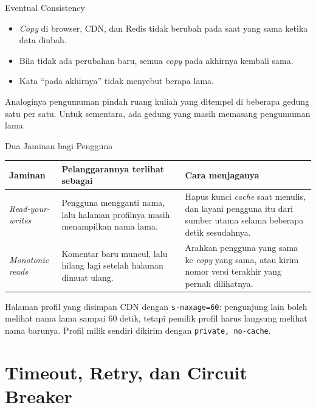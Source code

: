 \documentclass[aspectratio=169, table, 12pt]{beamer}
\begin{document}
\begin{frame}{{\Large Eventual Consistency}}
  \vspace{10pt}
  \begin{itemize}
    \item \textit{Copy} di browser, CDN, dan Redis tidak berubah pada saat yang sama
          ketika data diubah.
    \item Bila tidak ada perubahan baru, semua \textit{copy} pada akhirnya kembali
          sama.
    \item Kata ``pada akhirnya'' tidak menyebut berapa lama.
  \end{itemize}
  \vspace{8pt}
  {\footnotesize Analoginya pengumuman pindah ruang kuliah yang ditempel di
  beberapa gedung satu per satu. Untuk sementara, ada gedung yang masih
  memasang pengumuman lama.}
\end{frame}

\begin{frame}{{\Large Dua Jaminan bagi Pengguna}}
  \vspace{4pt}
  \centering
  {\scriptsize
  \begin{tabularx}{\textwidth}{lYY}
    \hline
    \textbf{Jaminan} & \textbf{Pelanggarannya terlihat sebagai} & \textbf{Cara menjaganya} \\
    \hline
    \textit{Read-your-writes} & Pengguna mengganti nama, lalu halaman profilnya masih menampilkan nama lama. & Hapus kunci \textit{cache} saat menulis, dan layani pengguna itu dari sumber utama selama beberapa detik sesudahnya. \\
    \hline
    \textit{Monotonic reads} & Komentar baru muncul, lalu hilang lagi setelah halaman dimuat ulang. & Arahkan pengguna yang sama ke \textit{copy} yang sama, atau kirim nomor versi terakhir yang pernah dilihatnya. \\
    \hline
  \end{tabularx}}

  \vspace{8pt}
  {\footnotesize Halaman profil yang disimpan CDN dengan \texttt{s-maxage=60}:
  pengunjung lain boleh melihat nama lama sampai 60 detik, tetapi pemilik
  profil harus langsung melihat nama barunya. Profil milik sendiri dikirim
  dengan \texttt{private, no-cache}.}
\end{frame}

\section{Timeout, Retry, dan Circuit Breaker}
\end{document}
